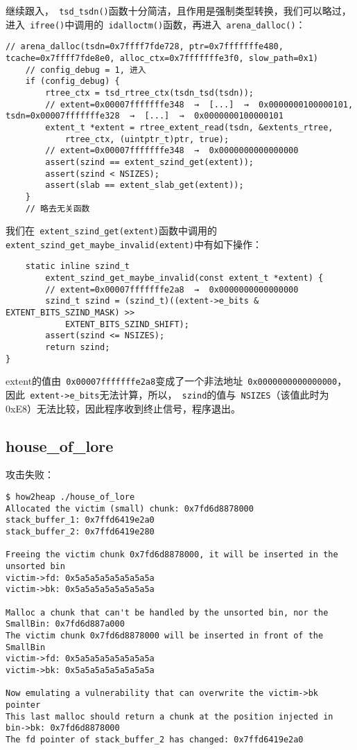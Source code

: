 继续跟入，\verb+ tsd_tsdn()+函数十分简洁，且作用是强制类型转换，我们可以略过，进入\verb+ ifree()+中调用的\verb+ idalloctm()+函数，再进入\verb+ arena_dalloc()+：
\begin{verbatim}
// arena_dalloc(tsdn=0x7ffff7fde728, ptr=0x7fffffffe480, tcache=0x7ffff7fde8e0, alloc_ctx=0x7fffffffe3f0, slow_path=0x1)
    // config_debug = 1, 进入
    if (config_debug) {
        rtree_ctx = tsd_rtree_ctx(tsdn_tsd(tsdn));
        // extent=0x00007fffffffe348  →  [...]  →  0x0000000100000101, tsdn=0x00007fffffffe328  →  [...]  →  0x0000000100000101
        extent_t *extent = rtree_extent_read(tsdn, &extents_rtree,
            rtree_ctx, (uintptr_t)ptr, true);
        // extent=0x00007fffffffe348  →  0x0000000000000000
        assert(szind == extent_szind_get(extent));
        assert(szind < NSIZES);
        assert(slab == extent_slab_get(extent));
    }
    // 略去无关函数
\end{verbatim}

我们在\verb+ extent_szind_get(extent)+函数中调用的\verb+ extent_szind_get_maybe_invalid(extent)+中有如下操作：
\begin{verbatim}
    static inline szind_t
        extent_szind_get_maybe_invalid(const extent_t *extent) {
        // extent=0x00007fffffffe2a8  →  0x0000000000000000
        szind_t szind = (szind_t)((extent->e_bits & EXTENT_BITS_SZIND_MASK) >>
            EXTENT_BITS_SZIND_SHIFT);
        assert(szind <= NSIZES);
        return szind;
}

\end{verbatim}

extent的值由\verb+ 0x00007fffffffe2a8+变成了一个非法地址\verb+ 0x0000000000000000+，因此\verb+ extent->e_bits+无法计算，所以，\verb+ szind+的值与\verb+ NSIZES+（该值此时为0xE8）无法比较，因此程序收到终止信号，程序退出。

\subsection{house\_of\_lore}

攻击失败：
\begin{verbatim}
$ how2heap ./house_of_lore 
Allocated the victim (small) chunk: 0x7fd6d8878000
stack_buffer_1: 0x7ffd6419e2a0
stack_buffer_2: 0x7ffd6419e280

Freeing the victim chunk 0x7fd6d8878000, it will be inserted in the unsorted bin
victim->fd: 0x5a5a5a5a5a5a5a5a
victim->bk: 0x5a5a5a5a5a5a5a5a

Malloc a chunk that can't be handled by the unsorted bin, nor the SmallBin: 0x7fd6d887a000
The victim chunk 0x7fd6d8878000 will be inserted in front of the SmallBin
victim->fd: 0x5a5a5a5a5a5a5a5a
victim->bk: 0x5a5a5a5a5a5a5a5a

Now emulating a vulnerability that can overwrite the victim->bk pointer
This last malloc should return a chunk at the position injected in bin->bk: 0x7fd6d8878000
The fd pointer of stack_buffer_2 has changed: 0x7ffd6419e2a0

\end{verbatim}

